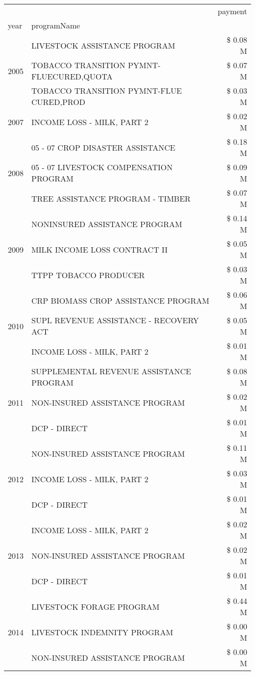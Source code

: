 \begin{tabular}{llr}
\toprule
 &  & payment \\
year & programName &  \\
\midrule
\multirow[t]{3}{*}{2005} & LIVESTOCK ASSISTANCE PROGRAM & \$ 0.08 M \\
 & TOBACCO TRANSITION PYMNT-FLUECURED,QUOTA & \$ 0.07 M \\
 & TOBACCO TRANSITION PYMNT-FLUE CURED,PROD & \$ 0.03 M \\
\cline{1-3}
2007 & INCOME LOSS - MILK, PART 2 & \$ 0.02 M \\
\cline{1-3}
\multirow[t]{3}{*}{2008} & 05 - 07 CROP DISASTER ASSISTANCE & \$ 0.18 M \\
 & 05 - 07 LIVESTOCK COMPENSATION PROGRAM & \$ 0.09 M \\
 & TREE ASSISTANCE PROGRAM - TIMBER & \$ 0.07 M \\
\cline{1-3}
\multirow[t]{3}{*}{2009} & NONINSURED ASSISTANCE PROGRAM & \$ 0.14 M \\
 & MILK INCOME LOSS CONTRACT II & \$ 0.05 M \\
 & TTPP TOBACCO PRODUCER & \$ 0.03 M \\
\cline{1-3}
\multirow[t]{3}{*}{2010} & CRP BIOMASS CROP ASSISTANCE PROGRAM & \$ 0.06 M \\
 & SUPL REVENUE ASSISTANCE - RECOVERY ACT & \$ 0.05 M \\
 & INCOME LOSS - MILK, PART 2 & \$ 0.01 M \\
\cline{1-3}
\multirow[t]{3}{*}{2011} & SUPPLEMENTAL REVENUE ASSISTANCE PROGRAM & \$ 0.08 M \\
 & NON-INSURED ASSISTANCE PROGRAM & \$ 0.02 M \\
 & DCP - DIRECT & \$ 0.01 M \\
\cline{1-3}
\multirow[t]{3}{*}{2012} & NON-INSURED ASSISTANCE PROGRAM & \$ 0.11 M \\
 & INCOME LOSS - MILK, PART 2 & \$ 0.03 M \\
 & DCP - DIRECT & \$ 0.01 M \\
\cline{1-3}
\multirow[t]{3}{*}{2013} & INCOME LOSS - MILK, PART 2 & \$ 0.02 M \\
 & NON-INSURED ASSISTANCE PROGRAM & \$ 0.02 M \\
 & DCP - DIRECT & \$ 0.01 M \\
\cline{1-3}
\multirow[t]{3}{*}{2014} & LIVESTOCK FORAGE PROGRAM & \$ 0.44 M \\
 & LIVESTOCK INDEMNITY PROGRAM & \$ 0.00 M \\
 & NON-INSURED ASSISTANCE PROGRAM & \$ 0.00 M \\

\end{tabular}
